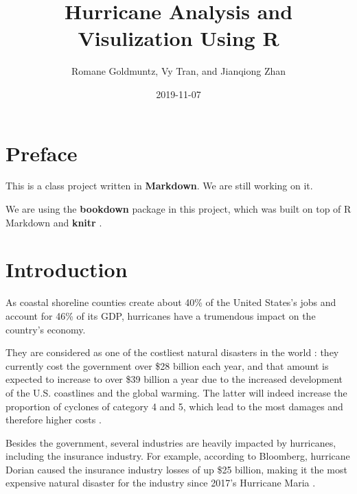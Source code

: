 \documentclass[]{book}
\title{Hurricane Analysis and Visulization Using R}
\author{Romane Goldmuntz, Vy Tran, and Jianqiong Zhan}
\date{2019-11-07}
\begin{document}
\maketitle

{
\setcounter{tocdepth}{1}
\tableofcontents
}
\hypertarget{preface}{%
\chapter{Preface}\label{preface}}

This is a class project written in \textbf{Markdown}. We are still working on it.

We are using the \textbf{bookdown} package \citep{R-bookdown} in this project, which was built on top of R Markdown and \textbf{knitr} \citep{xie2015}.

\hypertarget{intro}{%
\chapter{Introduction}\label{intro}}

As coastal shoreline counties create about 40\% of the United States's jobs and account for 46\% of its GDP, hurricanes have a trumendous impact on the country's economy.

They are considered as one of the costliest natural disasters in the world : they currently cost the government over \$28 billion each year, and that amount is expected to increase to over \$39 billion a year due to the increased development of the U.S. coastlines and the global warming. The latter will indeed increase the proportion of cyclones of category 4 and 5, which lead to the most damages and therefore higher costs \citep{Amadeo2019}.

Besides the government, several industries are heavily impacted by hurricanes, including the insurance industry. For example, according to Bloomberg, hurricane Dorian caused the insurance industry losses of up \$25 billion, making it the most expensive natural disaster for the industry since 2017's Hurricane Maria \citep{DSouza2019}.
\end{document}
